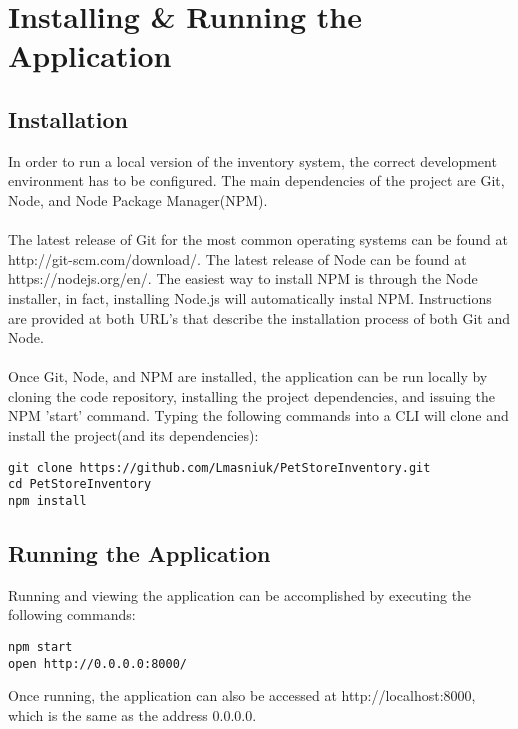 \documentclass[letterpaper, 12pt]{article}
\begin{document}


%
%

\section{Installing & Running the Application}

\subsection{Installation}
\noindent In order to run a local version of the inventory system, the correct development environment has to be configured. The main dependencies of the project are Git, Node, and Node Package Manager(NPM).
\\\\
The latest release of Git for the most common operating systems can be found at http://git-scm.com/download/. The latest release of Node can be found at https://nodejs.org/en/. The easiest way to install NPM is through the Node installer, in fact, installing Node.js will automatically instal NPM. Instructions are provided at both URL's that describe the installation process of both Git and Node. 
\\\\
Once Git, Node, and NPM are installed, the application can be run locally by cloning the code repository, installing the project dependencies, and issuing the NPM 'start' command. 
Typing the following commands into a CLI will clone and install the project(and its dependencies):
\begin{verbatim}
git clone https://github.com/Lmasniuk/PetStoreInventory.git
cd PetStoreInventory
npm install
\end{verbatim}



\subsection{Running the Application}
\noindent Running and viewing the application can be accomplished by executing the following commands:
\begin{verbatim}
npm start
open http://0.0.0.0:8000/
\end{verbatim}
Once running, the application can also be accessed at http://localhost:8000, which is the same as the address 0.0.0.0.
\end{document}
